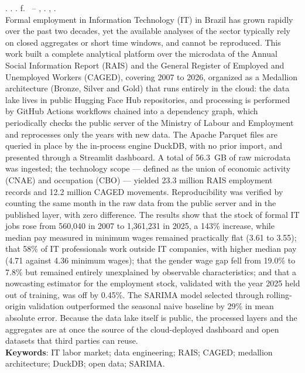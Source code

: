 
\begin{resumo}[ABSTRACT]
\begin{SingleSpacing}

\imprimirautorcitacao. \imprimirtitleabstract. \imprimirdata. \pageref{LastPage} f. \imprimirprojeto\ -- \imprimirprograma, \imprimirinstituicao. \imprimirlocal, \imprimirdata.\\

Formal employment in Information Technology (IT) in Brazil has grown rapidly over the past two decades, yet the available analyses of the sector typically rely on closed aggregates or short time windows, and cannot be reproduced. This work built a complete analytical platform over the microdata of the Annual Social Information Report (RAIS) and the General Register of Employed and Unemployed Workers (CAGED), covering 2007 to 2026, organized as a Medallion architecture (Bronze, Silver and Gold) that runs entirely in the cloud: the data lake lives in public Hugging Face Hub repositories, and processing is performed by GitHub Actions workflows chained into a dependency graph, which periodically checks the public server of the Ministry of Labour and Employment and reprocesses only the years with new data. The Apache Parquet files are queried in place by the in-process engine DuckDB, with no prior import, and presented through a Streamlit dashboard. A total of 56.3~GB of raw microdata was ingested; the technology scope --- defined as the union of economic activity (CNAE) and occupation (CBO) --- yielded 23.3 million RAIS employment records and 12.2 million CAGED movements. Reproducibility was verified by counting the same month in the raw data from the public server and in the published layer, with zero difference. The results show that the stock of formal IT jobs rose from 560,040 in 2007 to 1,361,231 in 2025, a 143\% increase, while median pay measured in minimum wages remained practically flat (3.61 to 3.55); that 58\% of IT professionals work outside IT companies, with higher median pay (4.71 against 4.36 minimum wages); that the gender wage gap fell from 19.0\% to 7.8\% but remained entirely unexplained by observable characteristics; and that a nowcasting estimator for the employment stock, validated with the year 2025 held out of training, was off by 0.45\%. The SARIMA model selected through rolling-origin validation outperformed the seasonal naive baseline by 29\% in mean absolute error. Because the data lake itself is public, the processed layers and the aggregates are at once the source of the cloud-deployed dashboard and open datasets that third parties can reuse.\\

\textbf{Keywords}: IT labor market; data engineering; RAIS; CAGED; medallion architecture; DuckDB; open data; SARIMA.

\end{SingleSpacing}
\end{resumo}
